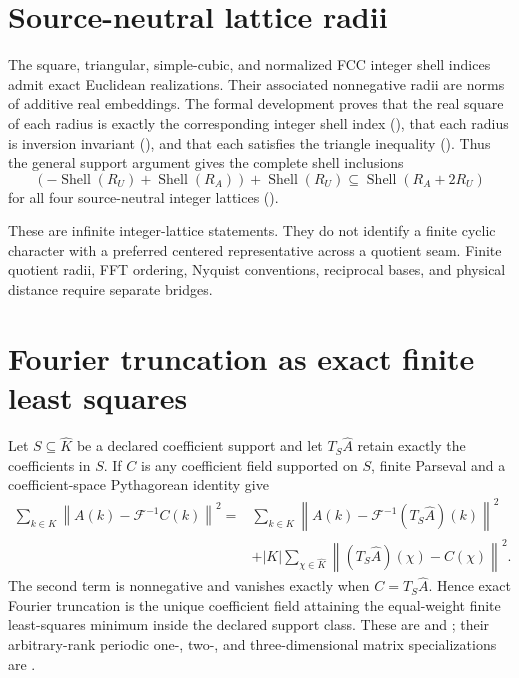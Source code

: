 \section{Source-neutral lattice radii}

The square, triangular, simple-cubic, and normalized FCC integer shell indices admit exact
Euclidean realizations.  Their associated nonnegative radii are norms of additive real embeddings.
The formal development proves that the real square of each radius is exactly the corresponding
integer shell index (), that each radius is inversion
invariant (), and that each satisfies the triangle
inequality ().  Thus the general support argument gives the complete
shell inclusions
\[
  (-\operatorname{Shell}(R_U)+\operatorname{Shell}(R_A))
       +\operatorname{Shell}(R_U)
  \subseteq \operatorname{Shell}(R_A+2R_U)
\]
for all four source-neutral integer lattices
().

These are infinite integer-lattice statements.  They do not identify a finite cyclic character
with a preferred centered representative across a quotient seam.  Finite quotient radii, FFT
ordering, Nyquist conventions, reciprocal bases, and physical distance require separate bridges.

\section{Fourier truncation as exact finite least squares}

Let $S\subseteq\widehat K$ be a declared coefficient support and let $T_S\widehat A$ retain exactly
the coefficients in $S$.  If $C$ is any coefficient field supported on $S$, finite Parseval and a
coefficient-space Pythagorean identity give
\[
\begin{split}
 \sum_{k\in K}\left\|A(k)-\mathcal F^{-1}C(k)\right\|^2
 ={}&\sum_{k\in K}
       \left\|A(k)-\mathcal F^{-1}(T_S\widehat A)(k)\right\|^2\\
 &+|K|\sum_{\chi\in\widehat K}
       \left\|(T_S\widehat A)(\chi)-C(\chi)\right\|^2.
\end{split}
\]
The second term is nonnegative and vanishes exactly when $C=T_S\widehat A$.  Hence exact Fourier
truncation is the unique coefficient field attaining the equal-weight finite least-squares minimum
inside the declared support class.  These are  and
; their arbitrary-rank periodic one-, two-, and three-dimensional
matrix specializations are .

